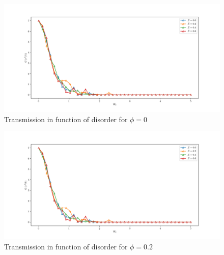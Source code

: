 \documentclass[12pt]{article}
\numberwithin{equation}{section}
\begin{document}
\newpage
\begin{figure}[h!]
  \begin{center}
  \includegraphics[height=0.85\textheight]{./media/transmission_graphene_lat_phi=0dot0Wmax=5.png}
  \caption{Transmission in function of disorder for $\phi=0$}
  \end{center}
\end{figure}
\begin{figure}[h!]
  \begin{center}
  \includegraphics[height=0.85\textheight]{./media/transmission_graphene_lat_phi=0dot0Wmax=5.png}
  \caption{Transmission in function of disorder for $\phi=0.2$}
  \end{center}
\end{figure}
\end{document}
